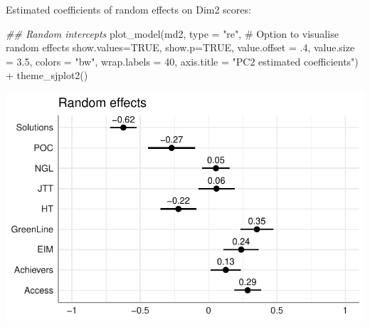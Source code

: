 \documentclass[
  letterpaper,
  DIV=11,
  numbers=noendperiod]{scrreprt}
\newenvironment{Shaded}{\begin{snugshade}}{\end{snugshade}}
\newcommand{\AttributeTok}[1]{\textcolor[rgb]{0.40,0.45,0.13}{#1}}
\newcommand{\CommentTok}[1]{\textcolor[rgb]{0.37,0.37,0.37}{#1}}
\newcommand{\ConstantTok}[1]{\textcolor[rgb]{0.56,0.35,0.01}{#1}}
\newcommand{\DecValTok}[1]{\textcolor[rgb]{0.68,0.00,0.00}{#1}}
\newcommand{\DocumentationTok}[1]{\textcolor[rgb]{0.37,0.37,0.37}{\textit{#1}}}
\newcommand{\FloatTok}[1]{\textcolor[rgb]{0.68,0.00,0.00}{#1}}
\newcommand{\FunctionTok}[1]{\textcolor[rgb]{0.28,0.35,0.67}{#1}}
\newcommand{\NormalTok}[1]{\textcolor[rgb]{0.00,0.23,0.31}{#1}}
\newcommand{\SpecialCharTok}[1]{\textcolor[rgb]{0.37,0.37,0.37}{#1}}
\newcommand{\StringTok}[1]{\textcolor[rgb]{0.13,0.47,0.30}{#1}}
\begin{document}
Estimated coefficients of random effects on Dim2 scores:

\begin{Shaded}
\begin{Highlighting}[]
\DocumentationTok{\#\# Random intercepts}
\FunctionTok{plot\_model}\NormalTok{(md2, }
           \AttributeTok{type =} \StringTok{"re"}\NormalTok{, }\CommentTok{\# Option to visualise random effects}
           \AttributeTok{show.values=}\ConstantTok{TRUE}\NormalTok{, }
           \AttributeTok{show.p=}\ConstantTok{TRUE}\NormalTok{,}
           \AttributeTok{value.offset =}\NormalTok{ .}\DecValTok{4}\NormalTok{,}
           \AttributeTok{value.size =} \FloatTok{3.5}\NormalTok{,}
           \AttributeTok{colors =} \StringTok{"bw"}\NormalTok{,}
           \AttributeTok{wrap.labels =} \DecValTok{40}\NormalTok{,}
           \AttributeTok{axis.title =} \StringTok{"PC2 estimated coefficients"}\NormalTok{) }\SpecialCharTok{+}
  \FunctionTok{theme\_sjplot2}\NormalTok{()}
\end{Highlighting}
\end{Shaded}

\includegraphics{AppendixF_files/figure-pdf/Dim2random-1.pdf}
\end{document}
